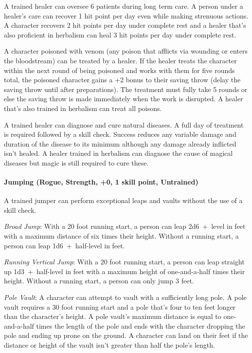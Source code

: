 \begin{multicols}{2}
A trained healer can oversee 6 patients during long term care.  A person under a healer's care can recover 1 hit point per day even while making strenuous actions.  A character recovers 2 hit points per day under complete rest and a healer that's also proficient in herbalism can heal 3 hit points per day under complete rest.  

A character poisoned with venom (any poison that afflicts via wounding or enters the bloodstream) can be treated by a healer.  If the healer treats the character within the next round of being poisoned and works with them for five rounds total, the poisoned character gains a +2 bonus to their saving throw (delay the saving throw until after preparations).  The treatment must fully take 5 rounds or else the saving throw is made immediately when the work is disrupted.  A healer that's also trained in herbalism can treat all poisons.

A trained healer can diagnose and cure natural diseases.  A full day of treatment is required followed by a skill check.  Success reduces any variable damage and duration of the disease to its minimum although any damage already inflicted isn't healed.  A healer trained in herbalism can diagnose the cause of magical diseases but magic is still required to cure these.

\paragraph{Jumping (Rogue, Strength, +0, 1 skill point, Untrained)}

A trained jumper can perform exceptional leaps and vaults without the use of a skill check.  

\textit{Broad Jump}: With a 20 foot running start, a person can leap 2d6~+~level in feet with a maximum distance of six times their height.  Without a running start, a person can leap 1d6~+~half-level in feet.

\textit{Running Vertical Jump}: With a 20 foot running start, a person can leap straight up 1d3~+~half-level in feet with a maximum height of one-and-a-half times their height.  Without a running start, a person can only jump 3 feet.

\textit{Pole Vault}: A character can attempt to vault with a sufficiently long pole.  A pole vault requires a 30 foot running start and a pole that's four to ten feet longer than the character's height.  A pole vault's maximum distance is equal to one-and-a-half times the length of the pole and ends with the character dropping the pole and ending up prone on the ground.  A character can land on their feet if the distance or height of the vault isn't greater than half the pole's length.


\end{multicols}

